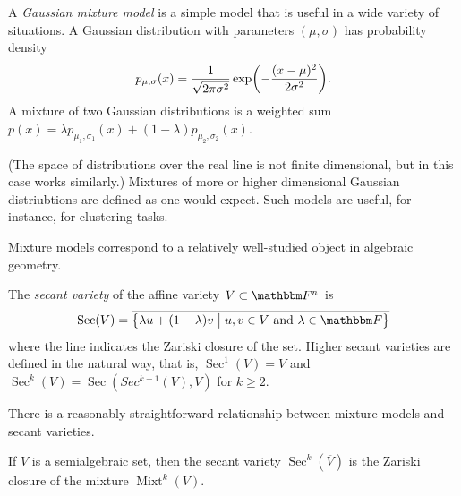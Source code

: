 \documentclass[11pt,titlepage]{article}
\newcommand*{\vbar}{\;\big\vert\;}
\DeclareMathOperator{\Mixt}{Mixt}
\DeclareMathOperator{\Sec}{Sec}
\begin{document}
    \begin{example}
    A \emph{Gaussian mixture model} is a simple model that is useful in a wide
    variety of situations.  A Gaussian distribution with parameters $(\mu,
    \sigma)$ has probability density
    \[
        p_{\mu, \sigma}(x) = \frac{1}{\sqrt{2\pi\sigma^2}} 
        \exp\pdil*{-\frac{(x - \mu)^2}{2\sigma^2}}.
    \]
    A mixture of two Gaussian distributions is a weighted sum $p(x) = \lambda
    p_{\mu_1, \sigma_1}(x) + (1 - \lambda)p_{\mu_2, \sigma_2}(x)$.  
    \begin{center}
    \end{center}
    (The space of distributions over the real line is not finite dimensional,
    but in this case works similarly.) Mixtures of more or higher dimensional
    Gaussian distriubtions are defined as one would expect.  Such models are
    useful, for instance, for clustering tasks.
    \end{example}

    Mixture models correspond to a relatively well-studied object in algebraic
    geometry.
    \begin{definition}
    The \emph{secant variety} of the affine variety $V \subset \F^n$ is
    \[
        \Sec(V) = \overline{\cdil[\big]{
        \lambda u + (1 - \lambda) v \vbar
        u,v \in V
        \text{ and }
        \lambda \in \F
        }}
    \]
    where the line indicates the Zariski closure of the set.  Higher secant
    varieties are defined in the natural way, that is, $\Sec^1(V) = V$ and
    $\Sec^k(V) = \Sec(Sec^{k-1}(V), V)$ for $k \ge 2$.
    \end{definition}

    There is a reasonably straightforward relationship between mixture models
    and secant varieties.
    \begin{proposition}
    If $V$ is a semialgebraic set, then the secant variety
    $\Sec^k(\overline{V})$ is the Zariski closure of the mixture $\Mixt^k(V)$.
    \end{proposition}
\end{document}
